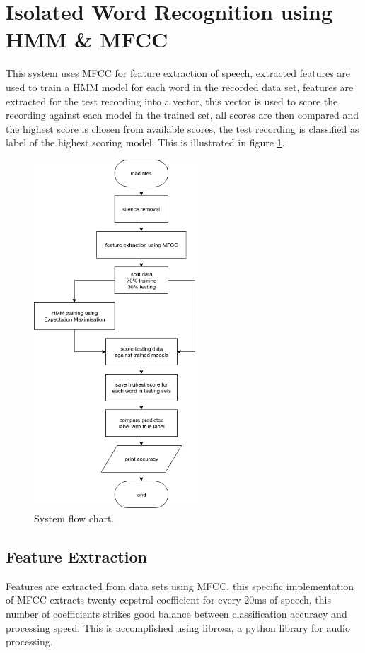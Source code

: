 \documentclass[12pt, a4paper, twoside]{report}
\begin{document}
\section{Isolated Word Recognition using HMM \& MFCC}
This system uses MFCC for feature extraction of speech, extracted features are used to train a HMM model for each word in the recorded data set, features are extracted for the test recording into a vector, this vector is used to score the recording against each model in the trained set, all scores are then compared and the highest score is chosen from available scores, the test recording is classified as label of the highest scoring model. This is illustrated in figure \ref{fig:hmm-diagram}.
\begin{figure}[!h]
	\centering
	\includegraphics[width=0.55\textwidth]
	{images/chapter5/hmm-diagram}
	\caption{System flow chart.}
	\label{fig:hmm-diagram}
\end{figure}

\subsection{Feature Extraction}
Features are extracted from data sets using MFCC, this specific implementation of MFCC extracts twenty cepstral coefficient for every 20ms of speech, this number of coefficients strikes good balance between classification accuracy and processing speed. This is accomplished using librosa, a python library for audio processing.
\end{document}

